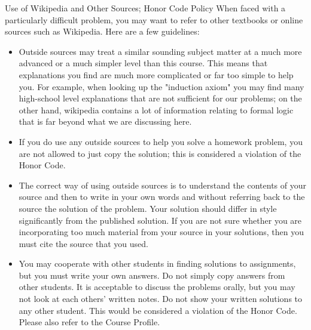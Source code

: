 \documentclass[smaller,hyperref={CJKbookmarks=true}]{beamer}
\begin{document}
\begin{spacing}{1.15}
\begin{frame}{Use of Wikipedia and Other Sources; Honor Code Policy}
When faced with a particularly dif{}ficult problem, you may want to refer to
other textbooks or online sources such as Wikipedia. Here are a few
guidelines:
\begin{itemize}
  \item Outside sources may treat a similar sounding subject matter at a
much more advanced or a much simpler level than this course. This
means that explanations you find are much more complicated or far
too simple to help you. For example, when looking up the "induction
axiom" you may find many high-school level explanations that are not
suf{}ficient for our problems; on the other hand, wikipedia contains a
lot of information relating to formal logic that is far beyond what we
are discussing here.
  \item If you do use any outside sources to help you solve a homework
problem, \textcolor[rgb]{1.00,0.00,0.00}{you are not allowed to just copy the solution;} this is
considered a violation of the Honor Code.
  \item The correct way of using outside sources is to understand the
contents of your source and then to write in your own words and
without referring back to the source the solution of the problem. Your
solution should dif{}fer in style significantly from the published solution.
\textcolor[rgb]{1.00,0.00,0.00}{If you are not sure whether you are incorporating too much material
from your source in your solutions, then you must cite the source that
you used.}
  \item You may cooperate with other students in finding solutions to
assignments, but you must write your own answers. \textcolor[rgb]{1.00,0.00,0.00}{Do not simply
copy answers from other students.} It is acceptable to discuss the
problems orally, but you may not look at each others' written notes.
\textcolor[rgb]{1.00,0.00,0.00}{Do not show your written solutions to any other student.} This would
be considered a violation of the Honor Code. Please also refer to the
Course Profile.
\end{itemize}
\end{frame} \end{spacing}
\end{document}
